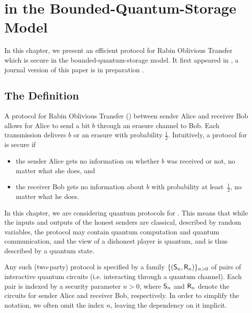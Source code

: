 \chapter[\RabinOT in the Bounded-Quantum-Storage Model]{\RabinOT in the Bounded-Quantum-Storage
  Model} \label{chap:RabinOT}
In this chapter, we present an efficient protocol for Rabin Oblivious Transfer
which is secure in the bounded-quantum-storage model. It first
appeared in \cite{DFSS05}, a journal version of this paper is in preparation
\cite{DFSS08journal}.

\section{The Definition} \label{sec:def-rabin-obliv-transf}
A protocol for Rabin Oblivious Transfer (\RabinOT) between sender
Alice and receiver Bob allows for Alice to send a bit $b$ through an
erasure  channel to Bob. Each transmission
delivers $b$ or an erasure with probability $\frac12$.  Intuitively, a
protocol for \RabinOT is secure if
\begin{itemize}
\item the sender Alice gets no information on whether $b$ was
                  received or not, no matter what she does, and
\item the receiver Bob gets no information about $b$ with
  probability at least~$\frac{1}{2}$, 
   no matter what he does. 
\end{itemize}
In this chapter, we are considering quantum protocols for \RabinOT. This
means that while the inputs and outputs of the honest senders are classical,
described by random variables, the protocol may contain quantum
computation and quantum communication, and the view of a dishonest
player is quantum, and is thus described by a %
quantum state. 

Any such (two-party) protocol is specified by a family
$\{({\sf S}_n,{\sf R}_n)\}_{n>0}$ of pairs of interactive quantum circuits (i.e.
interacting through a quantum channel). Each pair is indexed by a
security parameter $n>0$, where ${\sf S}_n$ and ${\sf R}_n$ denote the circuits
for sender Alice and receiver Bob, respectively.  In order to simplify
the notation, we often omit the index $n$, leaving the dependency on it
implicit.

